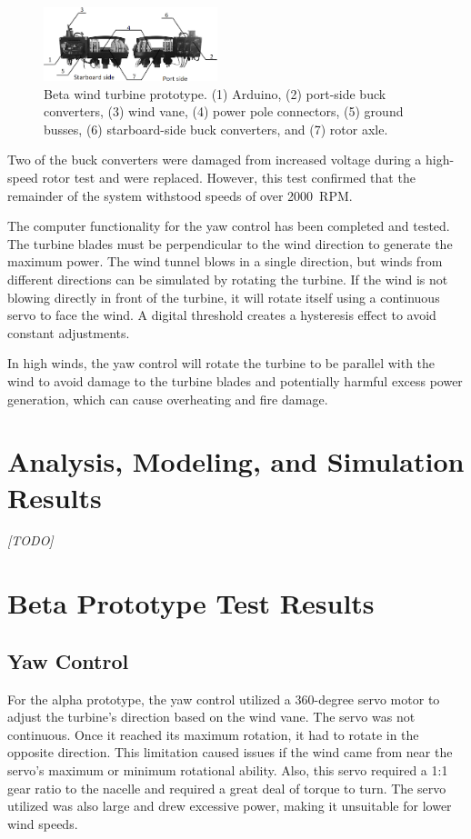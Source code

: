 \documentclass[11pt,letterpaper,conference]{IEEEtran}
\begin{document}
\begin{figure}[th]
    \centering
    \includegraphics[width=0.45\textwidth]{images/prototype.png}
    \caption{Beta wind turbine prototype. (1) Arduino, (2) port-side buck
        converters, (3) wind vane, (4) power pole connectors, (5) ground busses,
        (6) starboard-side buck converters, and (7) rotor axle.}
    \label{img:prototype}
\end{figure}

Two of the buck converters were damaged from increased voltage during a
high-speed rotor test and were replaced. However, this test confirmed that the
remainder of the system withstood speeds of over \qty{2000}{RPM}.

The computer functionality for the yaw control has been completed and tested.
The turbine blades must be perpendicular to the wind direction to generate the
maximum power. The wind tunnel blows in a single direction, but winds from
different directions can be simulated by rotating the turbine. If the wind is
not blowing directly in front of the turbine, it will rotate itself using a
continuous servo to face the wind. A digital threshold creates a hysteresis
effect to avoid constant adjustments.

In high winds, the yaw control will rotate the turbine to be parallel with the
wind to avoid damage to the turbine blades and potentially harmful excess power
generation, which can cause overheating and fire damage.

\section{Analysis, Modeling, and Simulation Results}

\emph{[TODO]}

\section{Beta Prototype Test Results}
\subsection{Yaw Control}
\label{sec:yaw_control}

For the alpha prototype, the yaw control utilized a 360-degree servo motor to
adjust the turbine's direction based on the wind vane. The servo was not
continuous. Once it reached its maximum rotation, it had to rotate in the
opposite direction. This limitation caused issues if the wind came from near the
servo's maximum or minimum rotational ability. Also, this servo required a 1:1
gear ratio to the nacelle and required a great deal of torque to turn. The
servo utilized was also large and drew excessive power, making it unsuitable
for lower wind speeds.
\end{document}
